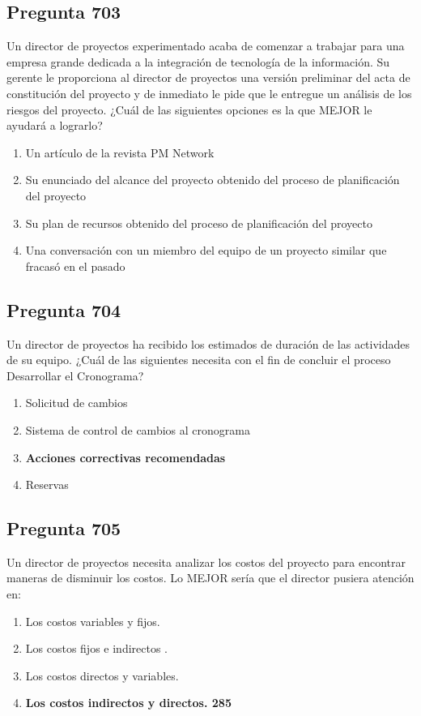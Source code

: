 \documentclass[11pt,a4paper]{article}
\begin{document}
\subsection*{Pregunta 703}
Un director de proyectos experimentado acaba de comenzar a trabajar para una empresa grande dedicada a la integración de tecnología de la información. Su gerente le proporciona al director de proyectos una versión preliminar del acta de constitución del proyecto y de inmediato le pide que le entregue un análisis de los riesgos del proyecto. ¿Cuál de las siguientes opciones es la que MEJOR le ayudará a lograrlo?

\begin{enumerate}[label=\alph*)]
  \item Un artículo de la revista PM Network
  \item Su enunciado del alcance del proyecto obtenido del proceso de planificación del proyecto
  \item Su plan de recursos obtenido del proceso de planificación del proyecto
  \item Una conversación con un miembro del equipo de un proyecto similar que fracasó en el pasado
\end{enumerate}

\subsection*{Pregunta 704}
Un director de proyectos ha recibido los estimados de duración de las actividades de su equipo. ¿Cuál de las siguientes necesita con el fin de concluir el proceso Desarrollar el Cronograma?

\begin{enumerate}[label=\alph*)]
  \item Solicitud de cambios
  \item Sistema de control de cambios al cronograma
  \item \textbf{Acciones correctivas recomendadas}
  \item Reservas
\end{enumerate}

\subsection*{Pregunta 705}
Un director de proyectos necesita analizar los costos del proyecto para encontrar maneras de disminuir los costos. Lo MEJOR sería que el director pusiera atención en:

\begin{enumerate}[label=\alph*)]
  \item Los costos variables y fijos.
  \item Los costos fijos e indirectos .
  \item Los costos directos y variables.
  \item \textbf{Los costos indirectos y directos. 285}
\end{enumerate}
\end{document}
